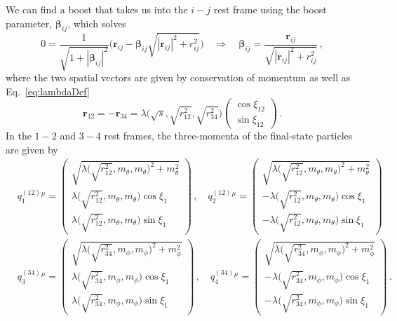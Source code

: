 \documentclass{article}
\numberwithin{equation}{subsection}
\begin{document}
We can find a boost that takes us into the $i-j$ rest frame using the boost parameter, $\pmb{\beta}_{ij}$, which solves
\begin{equation}
	0 = \frac{1}{\sqrt{1 + |\pmb{\beta}_{ij}|^2}}\Big(\mathbf{r}_{ij} - \pmb{\beta}_{ij}\sqrt{|\mathbf{r}_{ij}|^2 + r_{ij}^2}\Big) \quad \Rightarrow \quad
	\pmb{\beta}_{ij} = \frac{\mathbf{r}_{ij}}{\sqrt{|\mathbf{r}_{ij}|^2 + r_{ij}^2}}\,,
\end{equation}
where the two spatial vectors are given by conservation of momentum as well as Eq.~\eqref{eq:lambdaDef}
\begin{equation}
	\mathbf{r}_{12} = -\mathbf{r}_{34} = \lambda\Big(\sqrt{s}, \sqrt{r_{12}^2}, \sqrt{r_{34}^2}\Big)\begin{pmatrix}
		\cos\xi_{12} \\
		\sin\xi_{12}
	\end{pmatrix}\,.
\end{equation}
In the $1-2$ and $3-4$ rest frames, the three-momenta of the final-state particles are given by
\begin{equation}\begin{split}
	&q_1^{(12)}{}^\mu = \begin{pmatrix}
		\sqrt{\lambda\big(\sqrt{r_{12}^2}, m_\theta, m_\theta\big)^2 + m_\theta^2} \\
		\lambda\big(\sqrt{r_{12}^2}, m_\theta, m_\theta\big)\cos\xi_1 \\
		\lambda\big(\sqrt{r_{12}^2}, m_\theta, m_\theta\big)\sin\xi_1
	\end{pmatrix}\,, \quad
	q_2^{(12)}{}^\mu = \begin{pmatrix}
		\sqrt{\lambda\big(\sqrt{r_{12}^2}, m_\theta, m_\theta\big)^2 + m_\theta^2} \\
		- \lambda\big(\sqrt{r_{12}^2}, m_\theta, m_\theta\big)\cos\xi_1 \\
		- \lambda\big(\sqrt{r_{12}^2}, m_\theta, m_\theta\big)\sin\xi_1
	\end{pmatrix}\, \\[0.5em]
	&q_3^{(34)}{}^\mu = \begin{pmatrix}
		\sqrt{\lambda\big(\sqrt{r_{34}^2}, m_\phi, m_\phi\big)^2 + m_\phi^2} \\
		\lambda\big(\sqrt{r_{34}^2}, m_\phi, m_\phi\big)\cos\xi_1 \\
		\lambda\big(\sqrt{r_{34}^2}, m_\phi, m_\phi\big)\sin\xi_1
	\end{pmatrix}\,, \quad
	q_4^{(34)}{}^\mu = \begin{pmatrix}
		\sqrt{\lambda\big(\sqrt{r_{34}^2}, m_\phi, m_\phi\big)^2 + m_\phi^2} \\
		- \lambda\big(\sqrt{r_{34}^2}, m_\phi, m_\phi\big)\cos\xi_1 \\
		- \lambda\big(\sqrt{r_{34}^2}, m_\phi, m_\phi\big)\sin\xi_1
	\end{pmatrix}\,.
\end{split}\end{equation}
\end{document}
